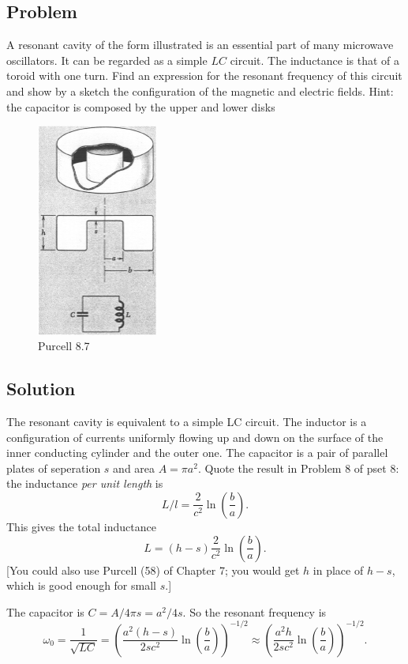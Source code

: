 \documentclass[solutions]{esg8022pset}
\begin{document}
\subsection{Problem}
 A resonant cavity of the form illustrated is an essential part of many microwave oscillators. It can be regarded as a simple $LC$ circuit. The inductance is that of a toroid with one turn. Find an expression for the resonant frequency of this circuit and show by a sketch the configuration of the magnetic and electric fields.
 Hint: the capacitor is composed by the upper and lower disks
 \begin{figure}[H]
    \centering
    \includegraphics[width = 4cm]{pu807}
    \caption{Purcell 8.7}
    \label{fig:cavity2}
  \end{figure}

\subsection{Solution}

The resonant cavity is equivalent to a simple LC circuit.  The
inductor is a configuration of currents uniformly flowing up and down
on the surface of the inner conducting cylinder and the outer one.
The capacitor is a pair of parallel plates of seperation $s$ and area
$A=\pi a^2$.  Quote the result in Problem 8 of pset 8: the inductance
{\sl per unit length} is
\[ L/l =\frac{2}{c^2}\ln{(\frac{b}{a})}.\]
This gives the total inductance
\[ L= (h-s)\frac{2}{c^2}\ln{(\frac{b}{a})}.\]
[You could also use Purcell (58) of Chapter 7; you would get $h$ in place of $h-s$, which is good enough
for small $s$.]

The capacitor is $C= A/4\pi s= a^2/4s$.  So the resonant frequency is
\begin{equation}
\omega_0=\frac{1}{\sqrt{LC}}= \left(\frac{a^2
(h-s)}{2sc^2}\ln(\frac{b}{a})\right)^{-1/2}
\approx  \left(\frac{a^2
h}{2sc^2}\ln(\frac{b}{a})\right)^{-1/2}.
\end{equation}
\end{document}
